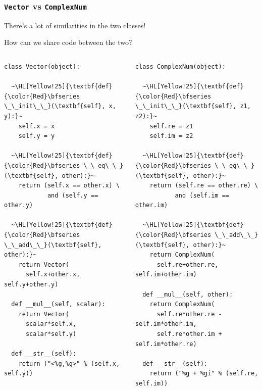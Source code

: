 \documentclass[english,serif,mathserif,xcolor=pdftex,dvipsnames,table]{beamer}
\begin{document}
\begin{frame}[fragile]
  \frametitle{\texttt{Vector} vs \texttt{ComplexNum}}

  There's a lot of similarities in the two classes!

  How can we share code between the two?

  \begin{columns}[t]
    \begin{column}{0.5\textwidth}
\begin{lstlisting}[basicstyle=\tiny\ttfamily,showstringspaces=false]
class Vector(object):

  ~\HL[Yellow!25]{\textbf{def} {\color{Red}\bfseries \_\_init\_\_}(\textbf{self}, x, y):}~
    self.x = x
    self.y = y

  ~\HL[Yellow!25]{\textbf{def} {\color{Red}\bfseries \_\_eq\_\_}(\textbf{self}, other):}~
    return (self.x == other.x) \
            and (self.y == other.y)

  ~\HL[Yellow!25]{\textbf{def} {\color{Red}\bfseries \_\_add\_\_}(\textbf{self}, other):}~
    return Vector(
      self.x+other.x, self.y+other.y)

  def __mul__(self, scalar):
    return Vector(
      scalar*self.x,
      scalar*self.y)

  def __str__(self):
    return ("<%g,%g>" % (self.x, self.y))
\end{lstlisting}
    \end{column}
    \begin{column}{0.5\textwidth}
\begin{lstlisting}[basicstyle=\tiny\ttfamily,showstringspaces=false]
class ComplexNum(object):

  ~\HL[Yellow!25]{\textbf{def} {\color{Red}\bfseries \_\_init\_\_}(\textbf{self}, z1, z2):}~
    self.re = z1
    self.im = z2

  ~\HL[Yellow!25]{\textbf{def} {\color{Red}\bfseries \_\_eq\_\_}(\textbf{self}, other):}~
    return (self.re == other.re) \
           and (self.im == other.im)

  ~\HL[Yellow!25]{\textbf{def} {\color{Red}\bfseries \_\_add\_\_}(\textbf{self}, other):}~
    return ComplexNum(
      self.re+other.re, self.im+other.im)

  def __mul__(self, other):
    return ComplexNum(
      self.re*other.re - self.im*other.im,
      self.re*other.im + self.im*other.re)

  def __str__(self):
    return ("%g + %gi" % (self.re, self.im))
\end{lstlisting}
    \end{column}
  \end{columns}
\end{frame}
\end{document}
